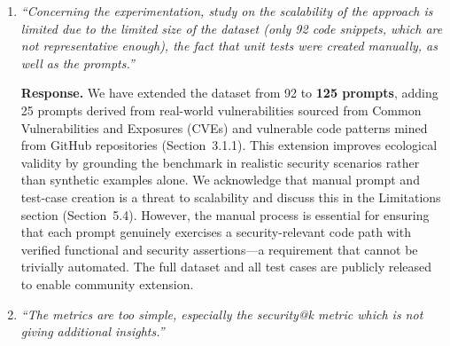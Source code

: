 \documentclass[12pt]{article}
\begin{document}
\begin{enumerate}[leftmargin=*, label=\textbf{R1.\arabic*.}]
\textbf{Response.}
We agree this is an important nuance. Our framework explicitly separates
\textit{functional correctness} (pass@k, measured by unit tests that verify
input/output behavior) from \textit{security correctness} (vulnerable@k /
security@k, measured by CodeQL and security-specific test assertions). A code
sample is considered functionally correct only if it passes the functional test
method; it is considered secure only if the security test method also passes (or
CodeQL detects no vulnerability). A sample may therefore be functionally correct
yet insecure, or insecure yet non-functional. This separation is what produces the
security--functionality trade-off discussed in Section~5.1: models with higher
pass@k (e.g., GPT-4o-Mini) simultaneously exhibit the highest vulnerability rates
under both assessment techniques. The framework design is described in
Section~3.3.2, and the trade-off is analyzed in Section~5.1.

\item \textit{``Concerning the experimentation, study on the scalability of the approach
is limited due to the limited size of the dataset (only 92 code snippets, which are not
representative enough), the fact that unit tests were created manually, as well as the
prompts.''}

\textbf{Response.}
We have extended the dataset from 92 to \textbf{125 prompts}, adding 25 prompts
derived from real-world vulnerabilities sourced from Common Vulnerabilities and
Exposures (CVEs) and vulnerable code patterns mined from GitHub repositories
(Section~3.1.1). This extension improves ecological validity by grounding the
benchmark in realistic security scenarios rather than synthetic examples alone. We
acknowledge that manual prompt and test-case creation is a threat to scalability
and discuss this in the Limitations section (Section~5.4). However, the manual
process is essential for ensuring that each prompt genuinely exercises a
security-relevant code path with verified functional and security
assertions---a requirement that cannot be trivially automated. The full dataset
and all test cases are publicly released to enable community extension.

\item \textit{``The metrics are too simple, especially the security@k metric which is
not giving additional insights.''}


\end{enumerate}
\end{document}
